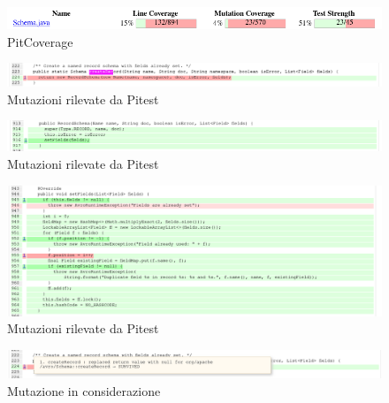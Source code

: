 \documentclass[12pt, a4paper]{article}
\begin{document}
  \begin{figure}
    \includegraphics[width=\linewidth]{./images/create_record/PitCoverage1.png}
    \caption{PitCoverage}
    \label{fig:PitMutationCreateRecord1}
  \end{figure}

  \begin{figure}
    \includegraphics[width=\linewidth]{./images/create_record/PitCoverage2.png}
    \caption{Mutazioni rilevate da Pitest}
    \label{fig:PitMutationCreateRecord2}
  \end{figure}

  \begin{figure}
    \includegraphics[width=\linewidth]{./images/create_record/PitCoverage3.png}
    \caption{Mutazioni rilevate da Pitest}
    \label{fig:PitMutationCreateRecord3}
  \end{figure}

  \begin{figure}
    \includegraphics[width=\linewidth]{./images/create_record/PitCoverage4.png}
    \caption{Mutazioni rilevate da Pitest}
    \label{fig:PitMutationCreateRecord4}
  \end{figure}
  \clearpage
  \begin{figure}
    \includegraphics[width=\linewidth]{./images/create_record/PitCoverage5.png}
    \caption{Mutazione in considerazione}
    \label{fig:PitMutationCreateRecord5}
  \end{figure}
\end{document}
